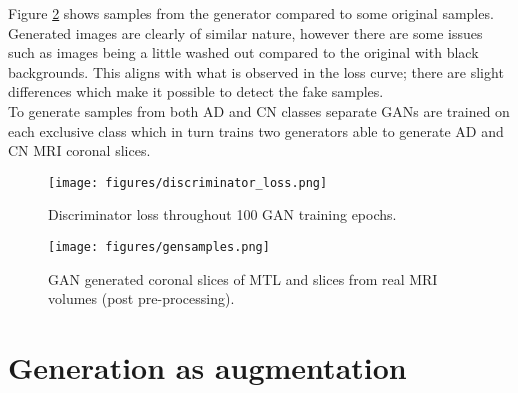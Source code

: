 \documentclass[
    author={Kai Hulme},
    supervisor={Dr Jon Bird},
    degree={BSc},
    title={Generative Adversarial Networks as an Augmentation Technique},
    subtitle={for Alzheimer's Disease Detection in MRI Volumes},
    type={Research},
    year={2021} 
]{dissertation}
\begin{document}
Figure \ref{oasis_gen_real_samples} shows samples from the generator compared to some original samples. Generated images are clearly of similar nature, however there are some issues such as images being a little washed out compared to the original with black backgrounds. This aligns with what is observed in the loss curve; there are slight differences which make it possible to detect the fake samples. \\

To generate samples from both AD and CN classes separate GANs are trained on each exclusive class which in turn trains two generators able to generate AD and CN MRI coronal slices.


\begin{figure}[t]
    \label{disc_training_loss}
    \centering
    \texttt{[image: figures/discriminator\_loss.png]}
    \caption{Discriminator loss throughout 100 GAN training epochs.}
\end{figure}

\begin{figure}[t]
    \label{oasis_gen_real_samples}
    \centering
    \texttt{[image: figures/gensamples.png]}
    \caption{GAN generated coronal slices of MTL and slices from real MRI volumes (post pre-processing).}
\end{figure}
	
	
\section{Generation as augmentation}


\end{document}
